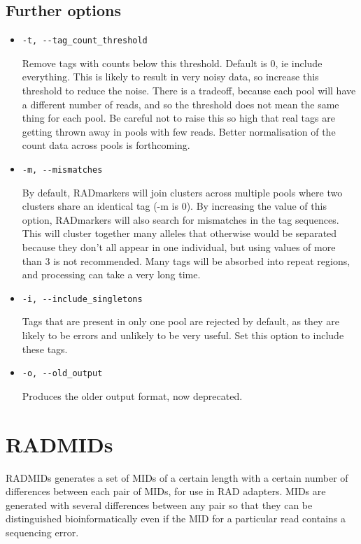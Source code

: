\documentclass[a4paper]{article}
\begin{document}
\subsection{Further options}

\begin{itemize}
    \item \verb|-t, --tag_count_threshold|
    
    Remove tags with counts below this threshold. Default is 0, ie include everything. This is likely to result in very noisy data, so increase this threshold to reduce the noise. There is a tradeoff, because each pool will have a different number of reads, and so the threshold does not mean the same thing for each pool. Be careful not to raise this so high that real tags are getting thrown away in pools with few reads. Better normalisation of the count data across pools is forthcoming.
    
    \item \verb|-m, --mismatches|
    
    By default, RADmarkers will join clusters across multiple pools where two clusters share an identical tag (-m is 0). By increasing the value of this option, RADmarkers will also search for mismatches in the tag sequences. This will cluster together many alleles that otherwise would be separated because they don't all appear in one individual, but using values of more than 3 is not recommended. Many tags will be absorbed into repeat regions, and processing can take a very long time.
    
    \item \verb|-i, --include_singletons|
    
    Tags that are present in only one pool are rejected by default, as they are likely to be errors and unlikely to be very useful. Set this option to include these tags.
    
    \item \verb|-o, --old_output|
    
    Produces the older output format, now deprecated.
    
    
\end{itemize}

\section{RADMIDs}

RADMIDs generates a set of MIDs of a certain length with a certain number of differences between each pair of MIDs, for use in RAD adapters. MIDs are generated with several differences between any pair so that they can be distinguished bioinformatically even if the MID for a particular read contains a sequencing error.
\end{document}
